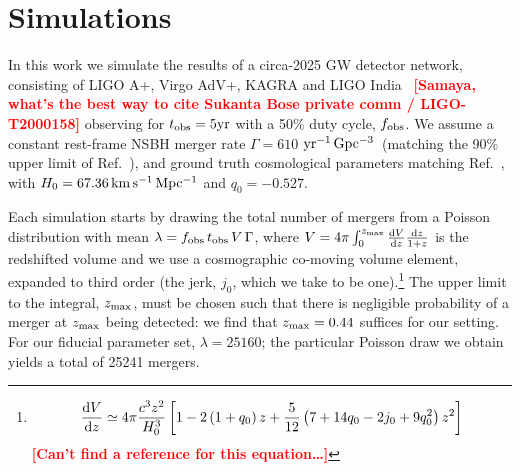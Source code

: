 \documentclass[%
 reprint,
 superscriptaddress,
 nofootinbib,
 amsmath,amssymb,
 aps,
]{revtex4-2}
\newcommand{\hubble}{\ensuremath{H_0}}
\newcommand{\decel}{\ensuremath{q_0}}
\newcommand{\jerk}{\ensuremath{j_0}}
\newcommand{\zmax}{\ensuremath{z_{\rm max}}}
\newcommand{\tobs}{t_{\rm obs}}
\newcommand{\fobs}{f_{\rm obs}}
\newcommand{\kmsmpc}{\ensuremath{{\rm km\,s^{-1}\,Mpc^{-1}}}}
\newcommand{\yr}{\ensuremath{{\rm yr}}}
\newcommand{\yrgpc}{\ensuremath{{\rm yr^{-1}\,Gpc^{-3}}}}
\newcommand{\smf}[1]{\textcolor{red}{\bf [#1]}}
\begin{document}

\section{Simulations} \label{sec:sims}

In this work we simulate the results of a circa-2025 GW detector network, consisting of LIGO A+, Virgo AdV+, KAGRA and LIGO India~\cite{Abbott_etal:2013} \smf{Samaya, what's the best way to cite Sukanta Bose private comm / LIGO-T2000158} observing for $\tobs = 5 \yr$ with a 50\% duty cycle, $\fobs$. We assume a constant rest-frame  NSBH merger rate $\Gamma = 610$ \yrgpc\ (matching the 90\% upper limit of Ref.~\cite{Ligo:2018}), and ground truth cosmological parameters matching Ref.~\cite{Planck_VI:2018}, with $\hubble=67.36\,\kmsmpc$ and $\decel=-0.527$.


Each simulation starts by drawing the total number of mergers from a Poisson distribution with mean $\lambda = \fobs \, \tobs \, V \, \Gamma $, where $V = 4\pi \int_0^{\zmax} \frac{{\rm d}V}{{\rm d}z} \frac{{\rm d}z}{1+z}$ is the redshifted volume and we use a cosmographic co-moving volume element, expanded to third order (the jerk, $j_0$, which we take to be one).\footnote{\begin{equation}
\frac{{\rm d}V}{{\rm d}z} \simeq 4\pi \frac{c^3 z^2}{\hubble^3} \left[1 - 2 \left(1 + \decel \right) z + \frac{5}{12} \left(7 + 14 \decel - 2 \jerk + 9 \decel^2 \right) z^2 \right] \nonumber
\end{equation}
\smf{Can't find a reference for this equation\ldots}
}
The upper limit to the integral, $\zmax$, must be chosen such that there is negligible probability of a merger at $\zmax$ being detected: we find that $\zmax=0.44$ suffices for our setting. For our fiducial parameter set, $\lambda = 25160$; the particular Poisson draw we obtain yields a total of 25241 mergers.
\end{document}
